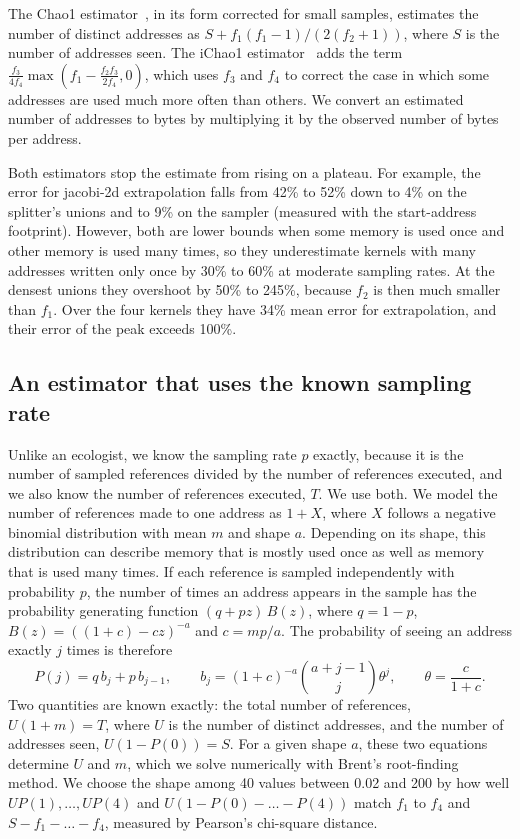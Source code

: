 \documentclass[11pt]{article}
\begin{document}
The Chao1 estimator~\cite{chao1984}, in its form corrected for small samples, estimates the number of distinct addresses as $S + f_1(f_1 - 1)/(2(f_2 + 1))$, where $S$ is the number of addresses seen. The iChao1 estimator~\cite{chiu2014ichao} adds the term $\frac{f_3}{4 f_4}\max(f_1 - \frac{f_2 f_3}{2 f_4}, 0)$, which uses $f_3$ and $f_4$ to correct the case in which some addresses are used much more often than others. We convert an estimated number of addresses to bytes by multiplying it by the observed number of bytes per address.

Both estimators stop the estimate from rising on a plateau. For example, the error for jacobi-2d extrapolation falls from 42\% to 52\% down to 4\% on the splitter's unions and to 9\% on the sampler (measured with the start-address footprint). However, both are lower bounds when some memory is used once and other memory is used many times, so they underestimate kernels with many addresses written only once by 30\% to 60\% at moderate sampling rates. At the densest unions they overshoot by 50\% to 245\%, because $f_2$ is then much smaller than $f_1$. Over the four kernels they have 34\% mean error for extrapolation, and their error of the peak exceeds 100\%.

\subsection{An estimator that uses the known sampling rate}
\label{sec:knownrate}

Unlike an ecologist, we know the sampling rate $p$ exactly, because it is the number of sampled references divided by the number of references executed, and we also know the number of references executed, $T$. We use both. We model the number of references made to one address as $1 + X$, where $X$ follows a negative binomial distribution with mean $m$ and shape $a$. Depending on its shape, this distribution can describe memory that is mostly used once as well as memory that is used many times. If each reference is sampled independently with probability $p$, the number of times an address appears in the sample has the probability generating function $(q + pz)\,B(z)$, where $q = 1 - p$, $B(z) = ((1+c) - cz)^{-a}$ and $c = mp/a$. The probability of seeing an address exactly $j$ times is therefore
\begin{equation}
P(j) = q\,b_j + p\,b_{j-1}, \qquad b_j = (1+c)^{-a} \binom{a + j - 1}{j} \theta^j, \qquad \theta = \frac{c}{1+c}.
\end{equation}
Two quantities are known exactly: the total number of references, $U(1 + m) = T$, where $U$ is the number of distinct addresses, and the number of addresses seen, $U(1 - P(0)) = S$. For a given shape $a$, these two equations determine $U$ and $m$, which we solve numerically with Brent's root-finding method. We choose the shape among 40 values between 0.02 and 200 by how well $U P(1), \dots, U P(4)$ and $U(1 - P(0) - \dots - P(4))$ match $f_1$ to $f_4$ and $S - f_1 - \dots - f_4$, measured by Pearson's chi-square distance.
\end{document}

